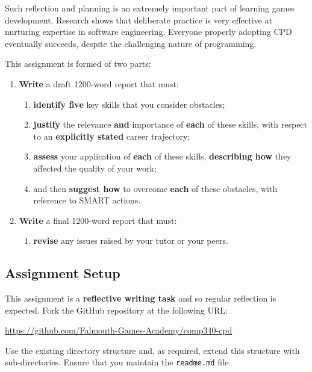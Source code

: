 \documentclass{../../fal_assignment}
\begin{document}
Such reflection and planning is an extremely important part of learning games development. Research shows that deliberate practice is very effective at nurturing expertise in software engineering. Everyone properly adopting CPD eventually succeeds, despite the challenging nature of programming.

This assignment is formed of two parts:

\begin{enumerate}[label=(\Alph*)]
    \item \textbf{Write} a draft 1200-word report that must:
    	\begin{enumerate}[label=\roman*.]
    		\item \textbf{identify five} key skills that you consider obstacles;
    		\item \textbf{justify} the relevance \textbf{and} importance of \textbf{each} of these skills, with respect to an \textbf{explicitly stated} career trajectory;
    		\item \textbf{assess} your application of \textbf{each} of these skills, \textbf{describing how} they affected the quality of your work;
    		\item and then \textbf{suggest how} to overcome \textbf{each} of these obstacles, with reference to SMART actions.
	\end{enumerate}
    \item \textbf{Write} a final 1200-word report that must:
    	\begin{enumerate}[label=\roman*.]
    		\item \textbf{revise} any issues raised by your tutor or your peers.
	\end{enumerate}
\end{enumerate}

\vspace{1em}

\subsection*{Assignment Setup}

This assignment is a \textbf{reflective writing task} and so regular reflection is expected. Fork the GitHub repository at the following URL:

\indent \url{https://github.com/Falmouth-Games-Academy/comp340-cpd}

Use the existing directory structure and, as required, extend this structure with sub-directories. Ensure that you maintain the \texttt{readme.md} file. 
\end{document}
